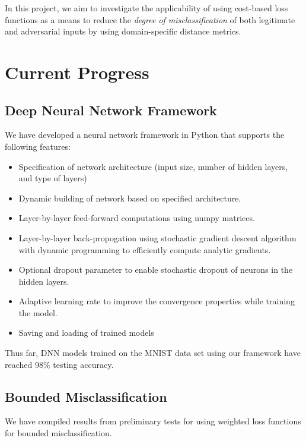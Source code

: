 \documentclass[12pt]{article}
\begin{document}
        In this project, we aim to investigate the applicability of using cost-based loss functions as a means to reduce the \textit{degree of misclassification} of both legitimate and adversarial inputs by using domain-specific distance metrics. 
        
    \section{Current Progress}
        \subsection{Deep Neural Network Framework}
        We have developed a neural network framework in Python that supports the following features:
        \begin{itemize}
            \itemsep0em
            \item Specification of network architecture (input size, number of hidden layers, and type of layers)
            \item Dynamic building of network based on specified architecture.
            \item Layer-by-layer feed-forward computations using numpy matrices.
            \item Layer-by-layer back-propogation using stochastic gradient descent algorithm with dynamic programming to efficiently compute analytic gradients. 
            \item Optional dropout parameter to enable stochastic dropout of neurons in the hidden layers.
            \item Adaptive learning rate to improve the convergence properties while training the model.
            \item Saving and loading of trained models
        \end{itemize}

        Thus far, DNN models trained on the MNIST data set using our framework have reached 98\% testing accuracy.

        \subsection{Bounded Misclassification}
        We have compiled results from preliminary tests for using weighted loss functions for bounded misclassification.
\end{document}
